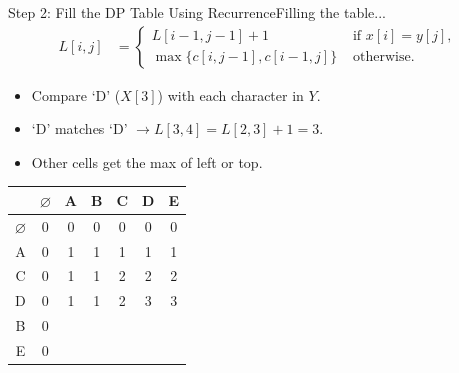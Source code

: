 \documentclass{beamer}
\begin{document}
\begin{frame}{Step 2: Fill the DP Table Using Recurrence}{Filling the table...}
    \vspace{-10mm}
    \scriptsize
    \begin{equation*}
        \begin{align*}
            L[i, j] &=
                        \begin{cases}
                            L[i - 1, j - 1] + 1 & \text{ if } x[i] = y[j] \text{, } \\
                            \max \{ c[i, j - 1], c[i - 1, j] \} & \text{ otherwise.}
                        \end{cases}
        \end{align*}
    \end{equation*}
    \begin{itemize}
        \item Compare `D' ($X[3]$) with each character in $Y$.
        \item `D' matches `D' $\longrightarrow L[3,4] = L[2,3] + 1 = 3$.
        \item Other cells get the max of left or top.
    \end{itemize}
    \vspace{6mm}
    \normalsize
    \centering
    \begin{tabular}{|c|c|c|c|c|c|c|} \hline
                      & $\varnothing$ & A & B & C & D & E \\ \hline
        $\varnothing$ &        0      & 0 & 0 & 0 & 0 & 0 \\ \hline
               A      &        0      & 1 & 1 & 1 & 1 & 1 \\ \hline
               C      &        0      & 1 & 1 & 2 & 2 & 2 \\ \hline
               D      &        0      & 1 & 1 & 2 & 3 & 3 \\ \hline
               B      &        0      &   &   &   &   &   \\ \hline
               E      &        0      &   &   &   &   &   \\ \hline
    \end{tabular}
\end{frame}
\end{document}
